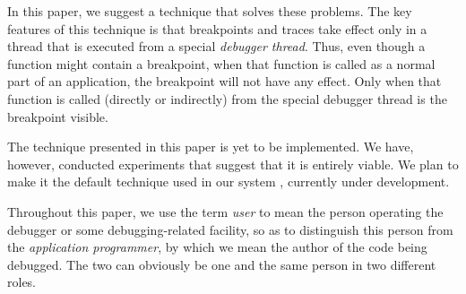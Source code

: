 In this paper, we suggest a technique that solves these problems.  The
key features of this technique is that breakpoints and traces take
effect only in a thread that is executed from a special \emph{debugger
  thread}.  Thus, even though a function might contain a breakpoint,
when that function is called as a normal part of an application, the
breakpoint will not have any effect.  Only when that function is
called (directly or indirectly) from the special debugger thread is
the breakpoint visible.

The technique presented in this paper is yet to be implemented.  We
have, however, conducted experiments that suggest that it is entirely
viable.  We plan to make it the default technique used in our system
\sicl{}, currently under development.

Throughout this paper, we use the term \emph{user} to mean the person
operating the debugger or some debugging-related facility, so as to
distinguish this person from the \emph{application programmer}, by
which we mean the author of the code being debugged.  The two can
obviously be one and the same person in two different roles.
